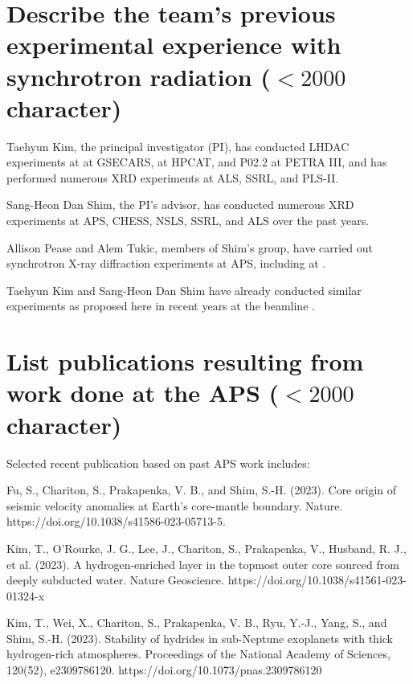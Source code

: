 \section{Describe the team's previous experimental experience with synchrotron radiation ($<2000$ character)}

Taehyun Kim, the principal investigator (PI), has conducted LHDAC experiments at  at GSECARS,  at HPCAT, and P02.2 at PETRA III, and has performed numerous XRD experiments at ALS, SSRL, and PLS-II.

Sang-Heon Dan Shim, the PI's advisor, has conducted numerous XRD experiments at APS, CHESS, NSLS, SSRL, and ALS over the past  years.

Allison Pease and Alem Tukic, members of Shim's group, have carried out synchrotron X-ray diffraction experiments at APS, including at .

Taehyun Kim and Sang-Heon Dan Shim have already conducted similar experiments as proposed here in recent years at the  beamline \cite{kim_Stability_2023, horn_Building_2025}.



\section{List publications resulting from work done at the APS  ($<2000$ character)}


Selected recent publication based on past APS work includes:

Fu, S., Chariton, S., Prakapenka, V. B., and Shim, S.-H. (2023). Core origin of seismic velocity anomalies at Earth's core-mantle boundary. Nature. https://doi.org/10.1038/s41586-023-05713-5. 

Kim, T., O'Rourke, J. G., Lee, J., Chariton, S., Prakapenka, V., Husband, R. J., et al. (2023). A hydrogen-enriched layer in the topmost outer core sourced from deeply subducted water. Nature Geoscience. https://doi.org/10.1038/s41561-023-01324-x

Kim, T., Wei, X., Chariton, S., Prakapenka, V. B., Ryu, Y.-J., Yang, S., and Shim, S.-H. (2023). Stability of hydrides in sub-Neptune exoplanets with thick hydrogen-rich atmospheres. Proceedings of the National Academy of Sciences, 120(52), e2309786120. https://doi.org/10.1073/pnas.2309786120

